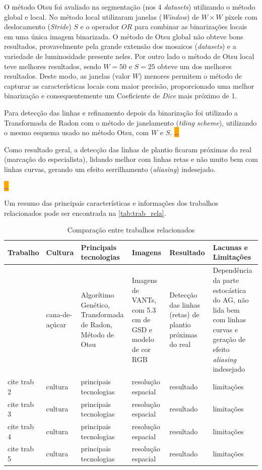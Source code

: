 \documentclass[12pt, a4paper, english, brazil]{article}
\newcommand{\dotsBlue}{\colorbox{orange}{\textcolor{blue}{\dots}}}
\begin{document}
O método Otsu foi avaliado na segmentação (nos 4 \textit{datasets}) utilizando o método global e local. No método local utilizaram janelas (\textit{Window}) de $W \times W$ pixels com deslocamento (\textit{Stride}) $S$ e o operador $OR$ para combinar as binarizações locais em uma única imagem binarizada. O método de Otsu global não obteve bons resultados, provavelmente pela grande extensão dos mosaicos (\textit{datasets}) e a variedade de luminosidade presente neles. Por outro lado o método de Otsu local teve melhores resultados, sendo $W=50$ e $S=25$ obteve um dos melhores resultados. Deste modo, as janelas (valor $W$) menores permitem o método de capturar as características locais com maior precisão, proporcionado uma melhor binarização e consequentemente um Coeficiente de \textit{Dice} mais próximo de 1.

Para detecção das linhas e refinamento depois da binarização foi utilizado a Transformada de Radon com o método de janelamento (\textit{tiling scheme}), utilizando o mesmo esquema usado no método Otsu, com $W$ e $S$. \dotsBlue

Como resultado geral, a detecção das linhas de plantio ficaram próximas do real (marcação do especialista), lidando melhor com linhas retas e não muito bem com linhas curvas, gerando um efeito serrilhamento (\textit{aliasing}) indesejado. 

\dotsBlue

Um resumo das principais características e informações dos trabalhos relacionados pode ser encontrada na \autoref{tab:trab_rela}.

\begin{landscape}
\begin{table}
\centering
\caption{Comparação entre trabalhos relacionados}
\label{tab:trab_rela}
\begin{tabularx}{\linewidth}{|L|L|L|L|L|L|} 
\hline
\textbf{Trabalho} & \textbf{Cultura} & \textbf{Principais tecnologias} & \textbf{Imagens} & \textbf{Resultado} & \textbf{Lacunas e Limitações} \\ \hline
\cite{Silva_Escarpinati_Backes_2021} & cana-de-açúcar & Algorítimo Genético, Transformada de Radon, Método de Otsu & Imagens de VANTs, com 5.3 cm de GSD e modelo de cor RGB & Detecção das linhas (retas) de plantio próximas do real & Dependência da parte estocástica do AG, não lida bem com linhas curvas e geração de efeito \textit{aliasing} indesejado \\ \hline
cite trab 2 & cultura & principais tecnologias & resolução espacial & resultado & limitações \\ \hline
cite trab 3 & cultura & principais tecnologias & resolução espacial & resultado & limitações \\ \hline
cite trab 4 & cultura & principais tecnologias & resolução espacial & resultado & limitações \\ \hline
cite trab 5 & cultura & principais tecnologias & resolução espacial & resultado & limitações \\ \hline
\end{tabularx}
\end{table}
\end{landscape}
\end{document}
